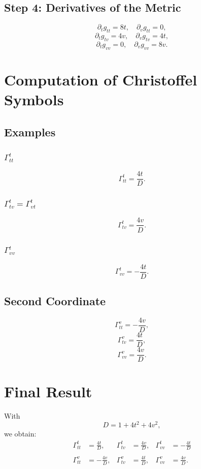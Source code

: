 \documentclass[a4paper,11pt]{article}
\begin{document}
	\subsection{Step 4: Derivatives of the Metric}
	
	\[
	\partial_t g_{tt} = 8t, \quad \partial_v g_{tt} = 0,
	\]
	\[
	\partial_t g_{tv} = 4v, \quad \partial_v g_{tv} = 4t,
	\]
	\[
	\partial_t g_{vv} = 0, \quad \partial_v g_{vv} = 8v.
	\]
	
	\section{Computation of Christoffel Symbols}
	
	\subsection{Examples}
	
	\subsubsection*{$\Gamma^t_{tt}$}
	
	\[
	\Gamma^t_{tt}
	=
	\frac{4t}{D}.
	\]
	
	\subsubsection*{$\Gamma^t_{tv} = \Gamma^t_{vt}$}
	
	\[
	\Gamma^t_{tv}
	=
	\frac{4v}{D}.
	\]
	
	\subsubsection*{$\Gamma^t_{vv}$}
	
	\[
	\Gamma^t_{vv}
	=
	-\frac{4t}{D}.
	\]
	
	\subsection{Second Coordinate}
	
	\[
	\Gamma^v_{tt}
	=
	-\frac{4v}{D},
	\]
	\[
	\Gamma^v_{tv}
	=
	\frac{4t}{D},
	\]
	\[
	\Gamma^v_{vv}
	=
	\frac{4v}{D}.
	\]
	
	\section{Final Result}
	
	With
	\[
	D = 1 + 4t^2 + 4v^2,
	\]
	we obtain:
	\[
	\begin{aligned}
		\Gamma^t_{tt} &= \frac{4t}{D}, &
		\Gamma^t_{tv} &= \frac{4v}{D}, &
		\Gamma^t_{vv} &= -\frac{4t}{D} \\
		\\
		\Gamma^v_{tt} &= -\frac{4v}{D}, &
		\Gamma^v_{tv} &= \frac{4t}{D}, &
		\Gamma^v_{vv} &= \frac{4v}{D}.
	\end{aligned}
	\]
	
\end{document}
